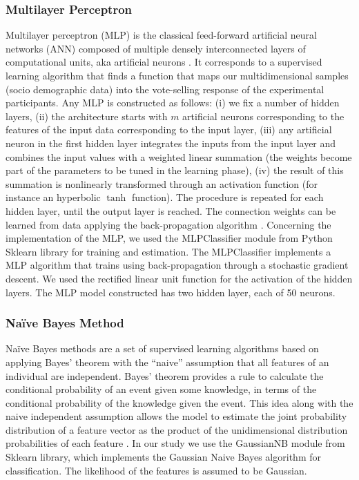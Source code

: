 \documentclass[onesided]{article}\usepackage[]{graphicx}\usepackage[]{color}
\begin{document}
\subsubsection{Multilayer Perceptron} Multilayer perceptron (MLP) is the classical feed-forward artificial neural networks (ANN) composed of multiple densely interconnected layers of computational units, aka artificial neurons \parencite{wolff2019machine}. It corresponds to a supervised learning algorithm that finds a function that maps our multidimensional samples (socio demographic data) into the vote-selling response of the experimental participants. Any MLP is constructed as follows: (i) we fix a number of hidden layers, (ii) the architecture starts with $m$ artificial neurons corresponding to the features of the input data corresponding to the input layer, (iii) any artificial neuron in the first hidden layer integrates the inputs from the input layer and combines the input values with a weighted linear summation (the weights become part of the parameters to be tuned in the learning phase), (iv) the result of this summation is nonlinearly transformed through an activation function (for instance an hyperbolic $\tanh$ function). The procedure is repeated for each hidden layer, until the output layer is reached. The connection weights can be learned from data applying the back-propagation algorithm \parencite{haykin2004comprehensive}. Concerning the implementation of the MLP, we used the MLPClassifier module from Python Sklearn library for training and estimation. The MLPClassifier implements a MLP algorithm that trains using back-propagation through a stochastic gradient descent. We used the rectified linear unit function for the activation of the hidden layers. The MLP model constructed has two hidden layer, each of 50 neurons.

\subsubsection{Na\"ive Bayes Method} Na\"ive Bayes methods are a set of supervised learning algorithms based on applying Bayes' theorem with the ``naive'' assumption that all features of an individual are independent. Bayes' theorem provides a rule to calculate the conditional probability of an event given some knowledge, in terms of the conditional probability of the knowledge given the event. This idea along with the naive independent assumption allows the model to estimate the joint probability distribution of a  feature vector as the product of the unidimensional distribution probabilities of each feature \parencite{wolff2019machine}. In our study we use the GaussianNB module from Sklearn library, which implements the Gaussian Naive Bayes algorithm for classification. The likelihood of the features is assumed to be Gaussian.
\end{document}
